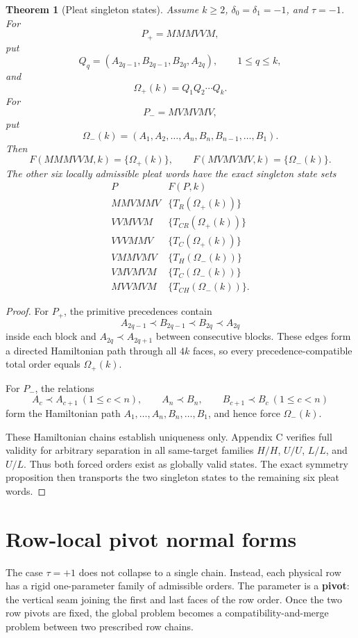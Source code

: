 \documentclass[11pt]{article}
\newtheorem{theorem}{Theorem}[section]
\theoremstyle{definition}
\theoremstyle{remark}
\begin{document}
\begin{theorem}[Pleat singleton states]\label{obj:T1}
Assume \(k\ge2\), \(\delta_0=\delta_1=-1\), and \(\tau=-1\). For \[
P_+=MMMVVM,
\] put \[
Q_q=(A_{2q-1},B_{2q-1},B_{2q},A_{2q}),\qquad 1\le q\le k,
\] and \[
\Omega_+(k)=Q_1Q_2\cdots Q_k.
\] For \[
P_-=MVMVMV,
\] put \[
\Omega_-(k)=(A_1,A_2,\ldots,A_n,B_n,B_{n-1},\ldots,B_1).
\] Then \[
F(MMMVVM,k)=\{\Omega_+(k)\},\qquad
F(MVMVMV,k)=\{\Omega_-(k)\}.
\] The other six locally admissible pleat words have the exact singleton
state sets \[
\begin{array}{c|c}
P & F(P,k)\\\hline
MMVMMV & \{T_R(\Omega_+(k))\}\\
VVMVVM & \{T_{CR}(\Omega_+(k))\}\\
VVVMMV & \{T_C(\Omega_+(k))\}\\
VMMVMV & \{T_H(\Omega_-(k))\}\\
VMVMVM & \{T_C(\Omega_-(k))\}\\
MVVMVM & \{T_{CH}(\Omega_-(k))\}.
\end{array}
\]
\end{theorem}
\begin{proof}
 For \(P_+\), the primitive precedences contain \[
A_{2q-1}\prec B_{2q-1}\prec B_{2q}\prec A_{2q}
\] inside each block and \(A_{2q}\prec A_{2q+1}\) between consecutive
blocks. These edges form a directed Hamiltonian path through all \(4k\)
faces, so every precedence-compatible total order equals
\(\Omega_+(k)\).

For \(P_-\), the relations \[
A_c\prec A_{c+1}\ (1\le c<n),\qquad
A_n\prec B_n,\qquad
B_{c+1}\prec B_c\ (1\le c<n)
\] form the Hamiltonian path \(A_1,\ldots,A_n,B_n,\ldots,B_1\), and
hence force \(\Omega_-(k)\).

These Hamiltonian chains establish uniqueness only. Appendix C verifies
full validity for arbitrary separation in all same-target families
\(H/H\), \(U/U\), \(L/L\), and \(U/L\). Thus both forced orders exist as
globally valid states. The exact symmetry proposition then transports
the two singleton states to the remaining six pleat words.
\end{proof}


\section{Row-local pivot normal
forms}\label{row-local-pivot-normal-forms}

The case \(\tau=+1\) does not collapse to a single chain. Instead, each
physical row has a rigid one-parameter family of admissible orders. The
parameter is a \textbf{pivot}: the vertical seam joining the first and
last faces of the row order. Once the two row pivots are fixed, the
global problem becomes a compatibility-and-merge problem between two
prescribed row chains.
\end{document}
